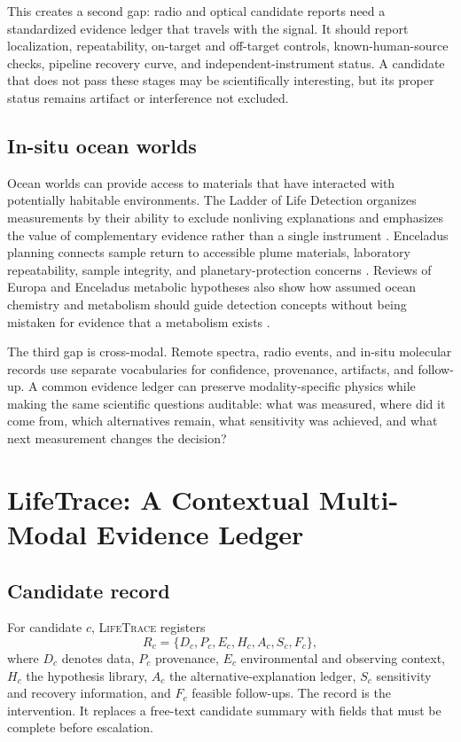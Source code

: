 \documentclass[conference]{IEEEtran}
\newcommand{\lifetrace}{\textsc{LifeTrace}}
\begin{document}
This creates a second gap: radio and optical candidate reports need a standardized evidence ledger that travels with the signal. It should report localization, repeatability, on-target and off-target controls, known-human-source checks, pipeline recovery curve, and independent-instrument status. A candidate that does not pass these stages may be scientifically interesting, but its proper status remains artifact or interference not excluded.

\subsection{In-situ ocean worlds}

Ocean worlds can provide access to materials that have interacted with potentially habitable environments. The Ladder of Life Detection organizes measurements by their ability to exclude nonliving explanations and emphasizes the value of complementary evidence rather than a single instrument \cite{neveu2018}. Enceladus planning connects sample return to accessible plume materials, laboratory repeatability, sample integrity, and planetary-protection concerns \cite{neveu2020}. Reviews of Europa and Enceladus metabolic hypotheses also show how assumed ocean chemistry and metabolism should guide detection concepts without being mistaken for evidence that a metabolism exists \cite{weber2023}.

The third gap is cross-modal. Remote spectra, radio events, and in-situ molecular records use separate vocabularies for confidence, provenance, artifacts, and follow-up. A common evidence ledger can preserve modality-specific physics while making the same scientific questions auditable: what was measured, where did it come from, which alternatives remain, what sensitivity was achieved, and what next measurement changes the decision?

\section{LifeTrace: A Contextual Multi-Modal Evidence Ledger}

\subsection{Candidate record}

For candidate \(c\), \lifetrace{} registers
\begin{equation}
 R_c=\{D_c,P_c,E_c,H_c,A_c,S_c,F_c\},
\label{eq:record}
\end{equation}
where \(D_c\) denotes data, \(P_c\) provenance, \(E_c\) environmental and observing context, \(H_c\) the hypothesis library, \(A_c\) the alternative-explanation ledger, \(S_c\) sensitivity and recovery information, and \(F_c\) feasible follow-ups. The record is the intervention. It replaces a free-text candidate summary with fields that must be complete before escalation.
\end{document}
